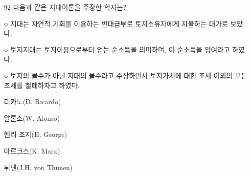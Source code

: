 \begin{question}{92}
다음과 같은 지대이론을 주장한 학자는?
\begin{framedtext}
○ 지대는 자연적 기회를 이용하는 반대급부로 토지소유자에게 지불하는 대가로 보았다. \par
○ 토지지대는 토지이용으로부터 얻는 순소득을 의미하며, 이 순소득을 잉여라고 하였다. \par
○ 토지의 몰수가 아닌 지대의 몰수라고 주장하면서 토지가치에 대한 조세 이외의 모든 조세를 철폐하자고 하였다. \par
\end{framedtext}
\begin{choices}
  \item 리카도(D. Ricardo)
  \item 알론소(W. Alonso)
  \item 헨리 조지(H. George)
  \item 마르크스(K. Marx)
  \item 튀넨(J.H. von Thünen)
\end{choices}
\end{question}
